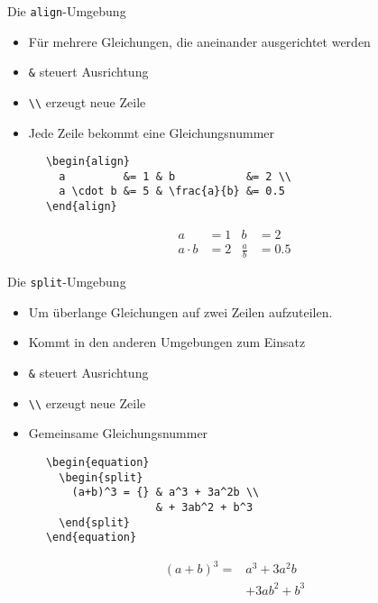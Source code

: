 \begin{frame}[fragile]{Die \texttt{align}-Umgebung}
  \begin{itemize}
    \item Für mehrere Gleichungen, die aneinander ausgerichtet werden
    \item \lstinline+&+ steuert Ausrichtung
    \item \verb+\\+ erzeugt neue Zeile
    \item Jede Zeile bekommt eine Gleichungsnummer
  \end{itemize}
  \begin{CodeExample}{0.6}
    \begin{lstlisting}
      \begin{align}
        a         &= 1 & b           &= 2 \\
        a \cdot b &= 5 & \frac{a}{b} &= 0.5
      \end{align}
    \end{lstlisting}
  \CodeResult
    \begin{align}
      a         &= 1 & b           &= 2 \\
      a \cdot b &= 2 & \frac{a}{b} &= 0.5
    \end{align}
  \end{CodeExample}
\end{frame}

\begin{frame}[fragile]{Die \texttt{split}-Umgebung}
  \begin{itemize}
    \item Um überlange Gleichungen auf zwei Zeilen aufzuteilen.
    \item Kommt in den anderen Umgebungen zum Einsatz
    \item \lstinline+&+ steuert Ausrichtung
    \item \verb+\\+ erzeugt neue Zeile
    \item Gemeinsame Gleichungsnummer
  \end{itemize}
  \begin{CodeExample}{0.55}
    \begin{lstlisting}
      \begin{equation}
        \begin{split}
          (a+b)^3 = {} & a^3 + 3a^2b \\
                       & + 3ab^2 + b^3
        \end{split}
      \end{equation}
    \end{lstlisting}
  \CodeResult
    \vspace{0.5em}
    \begin{equation}
      \begin{split}
        (a+b)^3 = {} & a^3 + 3a^2b \\
                     & + 3ab^2 + b^3
      \end{split}
    \end{equation}
  \end{CodeExample}
\end{frame}
